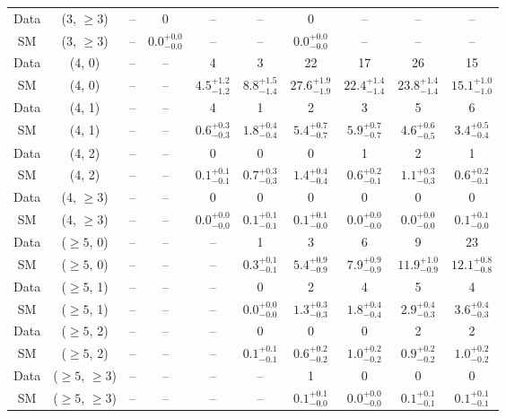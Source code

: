 \begin{table}[h!]
{\begin{tabular}{cccccccccc}
	Data & (3, $\ge3$) & -- & 0 & -- & -- & 0 & -- & -- & -- \\[0.5ex] 
	SM & (3, $\ge3$) & -- & $0.0^{+ 0.0 }_{- 0.0 }$ & -- & -- & $0.0^{+ 0.0 }_{- 0.0 }$ & -- & -- & -- \\[0.5ex] 
	Data & (4, 0) & -- & -- & 4 & 3 & 22 & 17 & 26 & 15 \\[0.5ex] 
	SM & (4, 0) & -- & -- & $4.5^{+ 1.2 }_{- 1.2 }$ & $8.8^{+ 1.5 }_{- 1.4 }$ & $27.6^{+ 1.9 }_{- 1.9 }$ & $22.4^{+ 1.4 }_{- 1.4 }$ & $23.8^{+ 1.4 }_{- 1.4 }$ & $15.1^{+ 1.0 }_{- 1.0 }$ \\[0.5ex] 
	Data & (4, 1) & -- & -- & 4 & 1 & 2 & 3 & 5 & 6 \\[0.5ex] 
	SM & (4, 1) & -- & -- & $0.6^{+ 0.3 }_{- 0.3 }$ & $1.8^{+ 0.4 }_{- 0.4 }$ & $5.4^{+ 0.7 }_{- 0.7 }$ & $5.9^{+ 0.7 }_{- 0.7 }$ & $4.6^{+ 0.6 }_{- 0.5 }$ & $3.4^{+ 0.5 }_{- 0.4 }$ \\[0.5ex] 
	Data & (4, 2) & -- & -- & 0 & 0 & 0 & 1 & 2 & 1 \\[0.5ex] 
	SM & (4, 2) & -- & -- & $0.1^{+ 0.1 }_{- 0.1 }$ & $0.7^{+ 0.3 }_{- 0.3 }$ & $1.4^{+ 0.4 }_{- 0.4 }$ & $0.6^{+ 0.2 }_{- 0.1 }$ & $1.1^{+ 0.3 }_{- 0.3 }$ & $0.6^{+ 0.2 }_{- 0.1 }$ \\[0.5ex] 
	Data & (4, $\ge3$) & -- & -- & 0 & 0 & 0 & 0 & 0 & 0 \\[0.5ex] 
	SM & (4, $\ge3$) & -- & -- & $0.0^{+ 0.0 }_{- 0.0 }$ & $0.1^{+ 0.1 }_{- 0.1 }$ & $0.1^{+ 0.1 }_{- 0.0 }$ & $0.0^{+ 0.0 }_{- 0.0 }$ & $0.0^{+ 0.0 }_{- 0.0 }$ & $0.1^{+ 0.1 }_{- 0.0 }$ \\[0.5ex] 
	Data & ($\ge5$, 0) & -- & -- & -- & 1 & 3 & 6 & 9 & 23 \\[0.5ex] 
	SM & ($\ge5$, 0) & -- & -- & -- & $0.3^{+ 0.1 }_{- 0.1 }$ & $5.4^{+ 0.9 }_{- 0.9 }$ & $7.9^{+ 0.9 }_{- 0.9 }$ & $11.9^{+ 1.0 }_{- 0.9 }$ & $12.1^{+ 0.8 }_{- 0.8 }$ \\[0.5ex] 
	Data & ($\ge5$, 1) & -- & -- & -- & 0 & 2 & 4 & 5 & 4 \\[0.5ex] 
	SM & ($\ge5$, 1) & -- & -- & -- & $0.0^{+ 0.0 }_{- 0.0 }$ & $1.3^{+ 0.3 }_{- 0.3 }$ & $1.8^{+ 0.4 }_{- 0.4 }$ & $2.9^{+ 0.4 }_{- 0.3 }$ & $3.6^{+ 0.4 }_{- 0.3 }$ \\[0.5ex] 
	Data & ($\ge5$, 2) & -- & -- & -- & 0 & 0 & 0 & 2 & 2 \\[0.5ex] 
	SM & ($\ge5$, 2) & -- & -- & -- & $0.1^{+ 0.1 }_{- 0.1 }$ & $0.6^{+ 0.2 }_{- 0.2 }$ & $1.0^{+ 0.2 }_{- 0.2 }$ & $0.9^{+ 0.2 }_{- 0.2 }$ & $1.0^{+ 0.2 }_{- 0.2 }$ \\[0.5ex] 
	Data & ($\ge5$, $\ge3$) & -- & -- & -- & -- & 1 & 0 & 0 & 0 \\[0.5ex] 
	SM & ($\ge5$, $\ge3$) & -- & -- & -- & -- & $0.1^{+ 0.1 }_{- 0.0 }$ & $0.0^{+ 0.0 }_{- 0.0 }$ & $0.1^{+ 0.1 }_{- 0.1 }$ & $0.1^{+ 0.1 }_{- 0.1 }$ \\[0.5ex] 
	\hline
	\hline
\end{tabular}}
\end{table}
